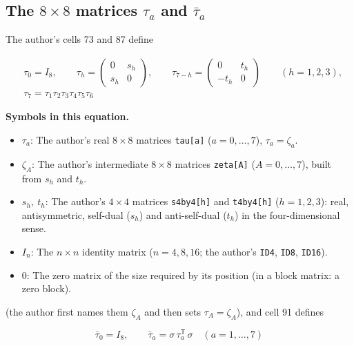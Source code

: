 \documentclass[
  10pt,
]{article}
\providecommand{\tightlist}{%
  \setlength{\itemsep}{0pt}\setlength{\parskip}{0pt}}
\begin{document}
\hypertarget{the-8-times-8-matrices-tau_a-and-bartau_a}{%
\subsection{\texorpdfstring{The \(8 \times 8\) matrices \(\tau_a\) and
\(\bar\tau_a\)}{The 8 \textbackslash times 8 matrices \textbackslash tau\_a and \textbackslash bar\textbackslash tau\_a}}\label{the-8-times-8-matrices-tau_a-and-bartau_a}}

The author's cells 73 and 87 define

\[
\begin{aligned}
&\tau_0 = I_8,\qquad \tau_h = \begin{pmatrix} 0 & s_h \\ s_h & 0 \end{pmatrix},\qquad \tau_{7-h} = \begin{pmatrix} 0 & t_h \\ -t_h & 0 \end{pmatrix}\qquad (h = 1, 2, 3),\\
&\tau_7 = \tau_1\tau_2\tau_3\tau_4\tau_5\tau_6
\end{aligned}
\]

\textbf{Symbols in this equation.}

\begin{itemize}
\tightlist
\item
  \(\tau_a\): The author's real \(8 \times 8\) matrices
  \texttt{tau{[}a{]}} (\(a = 0, \dots, 7\)), \(\tau_a = \zeta_a\).
\item
  \(\zeta_A\): The author's intermediate \(8 \times 8\) matrices
  \texttt{zeta{[}A{]}} (\(A = 0, \dots, 7\)), built from \(s_h\) and
  \(t_h\).
\item
  \(s_h,\ t_h\): The author's \(4 \times 4\) matrices
  \texttt{s4by4{[}h{]}} and \texttt{t4by4{[}h{]}} (\(h = 1, 2, 3\)):
  real, antisymmetric, self-dual (\(s_h\)) and anti-self-dual (\(t_h\))
  in the four-dimensional sense.
\item
  \(I_n\): The \(n \times n\) identity matrix (\(n = 4, 8, 16\); the
  author's \texttt{ID4}, \texttt{ID8}, \texttt{ID16}).
\item
  \(0\): The zero matrix of the size required by its position (in a
  block matrix: a zero block).
\end{itemize}

(the author first names them \(\zeta_A\) and then sets
\(\tau_A = \zeta_A\)), and cell 91 defines

\[
\bar\tau_0 = I_8,\qquad \bar\tau_a = \sigma\,\tau_a^{\mathsf T}\,\sigma\quad (a = 1, \dots, 7)
\]
\end{document}
